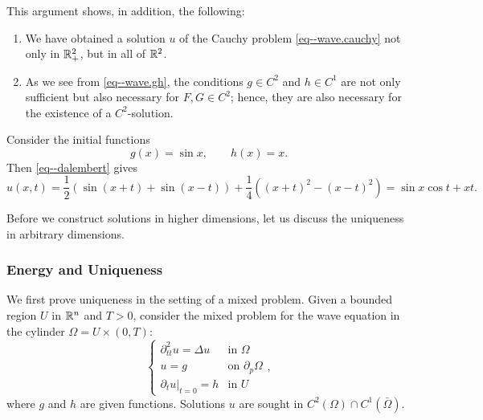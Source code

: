 \documentclass[11pt]{article}
\begin{document}
				This argument shows, in addition, the following:
				\begin{enumerate}
					\item We have obtained a solution $u$ of the Cauchy problem \eqref{eq--wave.cauchy} not only in $\mathbb{R}^2_+$, but in all of $\mathbb{R}^2$.
					\item As we see from \eqref{eq--wave.gh}, the conditions $g\in C^2$ and $h\in C^1$ are not only sufficient but also necessary for $F,G\in C^2$; hence, they are also necessary for the existence of a $C^2$-solution.
				\end{enumerate}

				\begin{eg}
					Consider the initial functions
					\begin{equation*}
						g(x)=\sin x,\qquad h(x)=x.
					\end{equation*}
					Then \eqref{eq--dalembert} gives
					\begin{equation*}
						u(x,t)=\frac{1}{2}\left(\sin(x+t)+\sin(x-t)\right)+\frac{1}{4}\left((x+t)^2-(x-t)^2\right)=\sin x\cos t+xt.
					\end{equation*}
				\end{eg}

				Before we construct solutions in higher dimensions, let us discuss the uniqueness in arbitrary dimensions.

			
			\subsubsection*{Energy and Uniqueness}

				We first prove uniqueness in the setting of a mixed problem. Given a bounded region $U$ in $\mathbb{R}^n$ and $T>0$, consider the mixed problem for the wave equation in the cylinder $\Omega=U\times(0,T)$:
				\begin{equation}\label{eq--uniqueness}
					\begin{cases}
						\partial_{tt}^2u=\Delta u & \text{in }\Omega\\
						u=g & \text{on }\partial_p\Omega\\
						\partial_tu|_{t=0}=h & \text{in }U
					\end{cases},
				\end{equation}
				where $g$ and $h$ are given functions. Solutions $u$ are sought in $C^2(\Omega)\cap C^1(\bar{\Omega})$.
\end{document}
